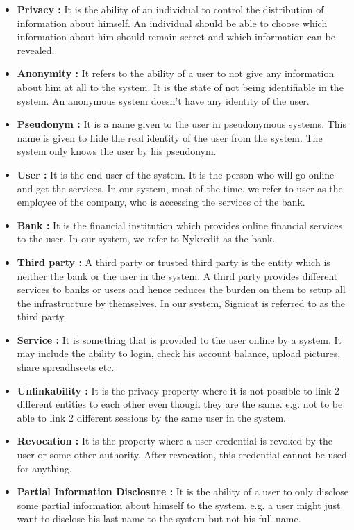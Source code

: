 \begin{itemize}
\item\textbf{Privacy :}
It is the ability of an individual to control the distribution of information about himself. An individual should be able to choose which information about him should remain secret and which information can be revealed.
\item\textbf{Anonymity\cite{Anonymity} :}
It refers to the ability of a user to not give any information about him at all to the system. It is the state of not being identifiable in the system. An anonymous system doesn't have any identity of the user.
\item\textbf{Pseudonym\cite{Pseudonyms} :}
It is a name given to the user in pseudonymous systems. This name is given to hide the real identity of the user from the system. The system only knows the user by his pseudonym.
\item\textbf{User :}
It is the end user of the system. It is the person who will go online and get the services. In our system, most of the time, we refer to user as the employee of the company, who is accessing the services of the bank.
\item\textbf{Bank :}
It is the financial institution which provides online financial services to the user. In our system, we refer to Nykredit as the bank.
\item\textbf{Third party :}
A third party or trusted third party is the entity which is neither the bank or the user in the system. A third party provides different services to banks or users and hence reduces the burden on them to setup all the infrastructure by themselves. In our system, Signicat is referred to as the third party.
\item\textbf{Service :}
It is something that is provided to the user online by a system. It may include the ability to login, check his account balance, upload pictures, share spreadhseets etc.
\item\textbf{Unlinkability :}
It is the privacy property where it is not possible to link 2 different entities to each other even though they are the same. 
e.g. not to be able to link 2 different sessions by the same user in the system.
\item\textbf{Revocation :}
It is the property where a user credential is revoked by the user or some other authority. After revocation, this credential cannot be used for anything.
\item\textbf{Partial Information Disclosure :}
It is the ability of a user to only disclose some partial information about himself to the system. e.g. a user might just want to disclose his last name to the system but not his full name.

\end{itemize}
